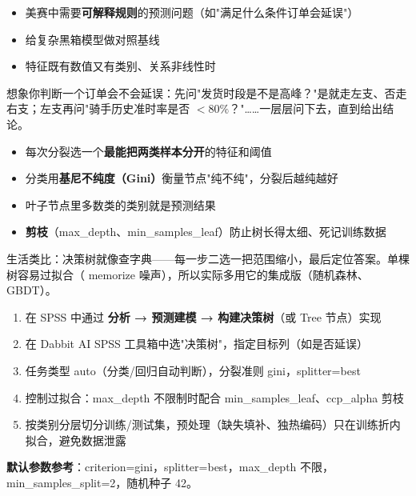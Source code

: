\begin{algoscene}
\begin{itemize}
    \item 美赛中需要\textbf{可解释规则}的预测问题（如"满足什么条件订单会延误"）
    \item 给复杂黑箱模型做对照基线
    \item 特征既有数值又有类别、关系非线性时
\end{itemize}
\end{algoscene}

\begin{algoprinciple}
想象你判断一个订单会不会延误：先问"发货时段是不是高峰？"是就走左支、否走右支；左支再问"骑手历史准时率是否 $<80\%$？"……一层层问下去，直到给出结论。

\begin{itemize}
    \item 每次分裂选一个\textbf{最能把两类样本分开}的特征和阈值
    \item 分类用\textbf{基尼不纯度（Gini）}衡量节点"纯不纯"，分裂后越纯越好
    \item 叶子节点里多数类的类别就是预测结果
    \item \textbf{剪枝}（max\_depth、min\_samples\_leaf）防止树长得太细、死记训练数据
\end{itemize}

生活类比：决策树就像查字典——每一步二选一把范围缩小，最后定位答案。单棵树容易过拟合（ memorize 噪声），所以实际多用它的集成版（随机森林、GBDT）。
\end{algoprinciple}

\begin{algosposs}
\begin{enumerate}
    \item 在 SPSS 中通过 \textbf{分析 → 预测建模 → 构建决策树}（或 Tree 节点）实现
    \item 在 Dabbit AI SPSS 工具箱中选"决策树"，指定目标列（如是否延误）
    \item 任务类型 auto（分类/回归自动判断），分裂准则 gini，splitter=best
    \item 控制过拟合：max\_depth 不限制时配合 min\_samples\_leaf、ccp\_alpha 剪枝
    \item 按类别分层切分训练/测试集，预处理（缺失填补、独热编码）只在训练折内拟合，避免数据泄露
\end{enumerate}

\textbf{默认参数参考}：criterion=gini，splitter=best，max\_depth 不限，min\_samples\_split=2，随机种子 42。
\end{algosposs}


